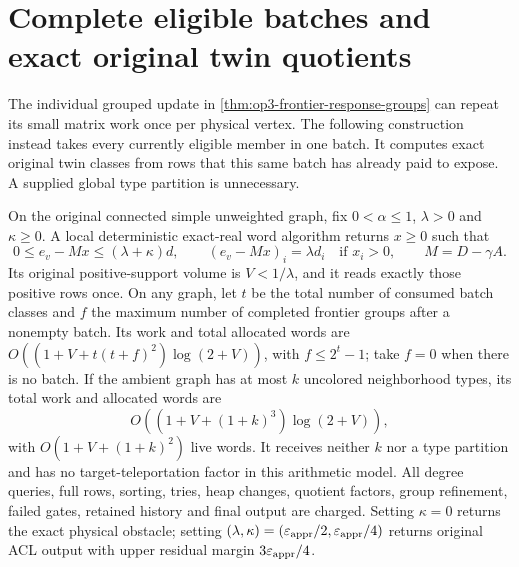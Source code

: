\section{Complete eligible batches and exact original twin quotients}
\label{sec:op3-batch-type-quotient}

The individual grouped update in \cref{thm:op3-frontier-response-groups}
can repeat its small matrix work once per physical vertex. The following
construction instead takes every currently eligible member in one batch.
It computes exact original twin classes from rows that this same batch
has already paid to expose. A supplied global type partition is unnecessary.

\begin{theorem}
\label{thm:op3-batch-type-quotient}
On the original connected simple unweighted graph, fix
$0<\alpha\leq1$, $\lambda>0$ and $\kappa\geq0$. A local deterministic
exact-real word algorithm returns $x\geq0$ such that
\[
 0\leq e_v-Mx\leq(\lambda+\kappa)d,
 \qquad (e_v-Mx)_i=\lambda d_i\quad\text{if }x_i>0,
 \qquad M=D-\gamma A.
\]
Its original positive-support volume is $V<1/\lambda$, and it reads
exactly those positive rows once. On any graph, let $t$ be the total
number of consumed batch classes and $f$ the maximum number of completed
frontier groups after a nonempty batch. Its work and total allocated words
are $O((1+V+t(t+f)^2)\log(2+V))$, with $f\leq2^t-1$; take $f=0$
when there is no batch. If the ambient graph has at most $k$
uncolored neighborhood types, its total work and allocated words are
\begin{equation}
 O\left((1+V+(1+k)^3)\log(2+V)\right),
 \label{eq:op3-batch-type-work}
\end{equation}
with $O(1+V+(1+k)^2)$ live words. It receives neither $k$ nor a type
partition and has no target-teleportation factor in this arithmetic model.
All degree queries, full rows, sorting, tries, heap changes, quotient
factors, group refinement, failed gates, retained history and final output
are charged. Setting $\kappa=0$ returns the exact physical obstacle;
setting $(\lambda,\kappa)=(\varepsilon_{\mathrm{appr}}/2,\varepsilon_{\mathrm{appr}}/4)$ returns original ACL
output with upper residual margin $3\varepsilon_{\mathrm{appr}}/4$.
\end{theorem}

